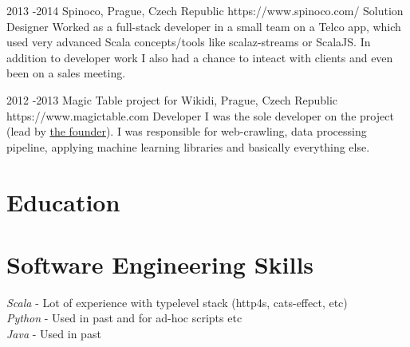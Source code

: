 \documentclass[10pt]{article} %
\begin{document}

\job
{2013 -}{2014 }
{Spinoco, Prague, Czech Republic}
{https://www.spinoco.com/}
{Solution Designer}
{Worked as a full-stack developer in a small team on a Telco app, which used very advanced Scala concepts/tools like scalaz-streams or ScalaJS. In addition to developer work I also had a chance to inteact with clients and even been on a sales meeting.\\
}


\job
{2012 -}{2013}
{Magic Table project for Wikidi, Prague, Czech Republic}
{https://www.magictable.com}
{Developer}
{I was the sole developer on the project (lead by \href{https://michal.illich.cz/}{the founder}). I was responsible for web-crawling, data processing pipeline, applying machine learning libraries and basically everything else. \\
}



\section{Education}



\section{Software Engineering Skills}

{
\textit{Scala} - Lot of experience with typelevel stack (http4s, cats-effect, etc)\\
\textit{Python} - Used in past and for ad-hoc scripts etc\\
\textit{Java} - Used in past\\
}
\end{document}
